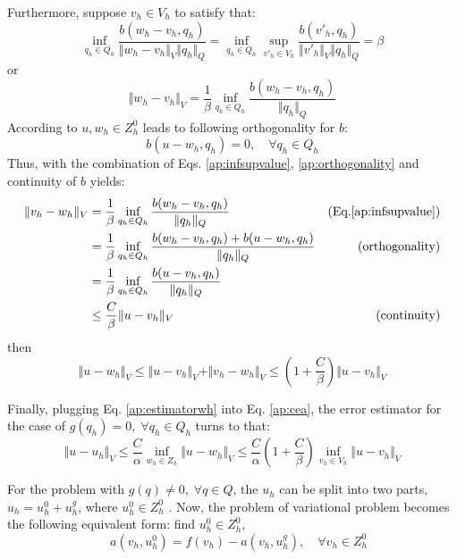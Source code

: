 Furthermore, suppose $v_h \in V_h$ to satisfy that:
\begin{equation}
\inf_{q_h \in Q_h} \frac{b(w_h-v_h,q_h)}{\Vert w_h-v_h \Vert_V \Vert q_h \Vert_Q} =
\inf_{q_h \in Q_h} \sup_{v'_h \in V_h} \frac{b(v'_h,q_h)}{\Vert v'_h \Vert_V \Vert q_h \Vert_Q} = \beta
\end{equation}
or
\begin{equation}\label{ap:infsupvalue}
\Vert w_h-v_h \Vert_V =\frac{1}{\beta} \inf_{q_h \in Q_h} \frac{b(w_h-v_h,q_h)}{\Vert q_h \Vert_Q}
\end{equation}
According to $u, w_h\in Z^0_h$ leads to following orthogonality for $b$:
\begin{equation}\label{ap:orthogonality}
b(u-w_h,q_h) = 0 ,\quad \forall q_h \in Q_h
\end{equation}
Thus, with the combination of Eqs. \eqref{ap:infsupvalue}, \eqref{ap:orthogonality} and continuity of $b$ yields:
\begin{equation}\label{ap:r3}
\begin{aligned}
    \Vert v_h - w_h \Vert_V &=\frac{1}{\beta} \inf_{q_h \in Q_h} \frac{b(w_h-v_h,q_h)}{\Vert q_h \Vert_Q} & \textrm{(Eq.}\eqref{ap:infsupvalue} \textrm{)} \\
    &=\frac{1}{\beta} \inf_{q_h \in Q_h} \frac{b(w_h-v_h,q_h) + b(u-w_h,q_h)}{\Vert q_h \Vert_Q} & \textrm{(orthogonality)}\\
&=\frac{1}{\beta}\inf_{q_h \in Q_h} \frac{b(u-v_h,q_h)}{\Vert q_h \Vert_Q} & \\
&\le\frac{C}{\beta} \Vert u-v_h \Vert_V & \textrm{(continuity)}
\end{aligned}
\end{equation}
then
\begin{equation}\label{ap:estimatorwh}
    \Vert u-w_h \Vert_V \le \Vert u-v_h \Vert_V + \Vert v_h-w_h \Vert_V \le (1+\frac{C}{\beta})\Vert u-v_h \Vert_V 
\end{equation}

Finally, plugging Eq. \eqref{ap:estimatorwh} into Eq. \eqref{ap:cea}, the error estimator for the case of $g(q_h)=0, \; \forall q_h \in Q_h$ turns to that:
\begin{equation}
\Vert u-u_h \Vert_V \le \frac{C}{\alpha} \inf_{w_h \in Z_h}\Vert u-w_h \Vert_V\le \frac{C}{\alpha} (1+\frac{C}{\beta}) \inf_{v_h \in V_h} \Vert u-v_h \Vert_V
\end{equation}

For the problem with $g(q)\ne0,\; \forall q \in Q$, the $u_h$ can be split into two parts, $u_h=u^0_h + u^g_h$, where $u^0_h \in Z^0_h$ \cite{arnold1987}. Now, the problem of variational problem becomes the following equivalent form: find $u^0_h \in Z^0_h$,
\begin{equation} \label{ap:r2}
\quad a(v_h,u^0_h) = f(v_h) - a(v_h,u^g_h), \quad \forall v_h \in Z^0_h
\end{equation}


